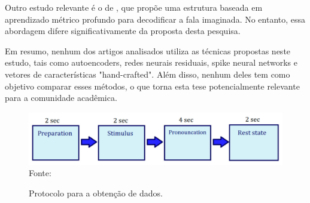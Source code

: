\documentclass[a4paper,12pt,openright,oneside]{book}
\newenvironment{myenv}[1]
  {\begin{spacing}{#1}}
  {\end{spacing}}
\begin{document}
\begin{myenv}{1.5}
					\par Outro estudo relevante é o de \cite{lee2021decoding}, que propõe uma estrutura baseada em aprendizado métrico profundo para decodificar a fala imaginada. No entanto, essa abordagem difere significativamente da proposta desta pesquisa.
					
					\par Em resumo, nenhum dos artigos analisados utiliza as técnicas propostas neste estudo, tais como autoencoders, redes neurais residuais, spike neural networks e vetores de características "hand-crafted". Além disso, nenhum deles tem como objetivo comparar esses métodos, o que torna esta tese potencialmente relevante para a comunidade acadêmica.
				
				\begin{figure}
					\centering
					\caption[Protocolo de obtenção]{Protocolo para a obtenção de dados.}
					\includegraphics[width=0.7\linewidth]{images/recordingProtocol}
					\\ Fonte: \cite{tamm2020classification}
					\label{fig:recordingprotocol}
				\end{figure}
		\end{myenv}
\end{document}
